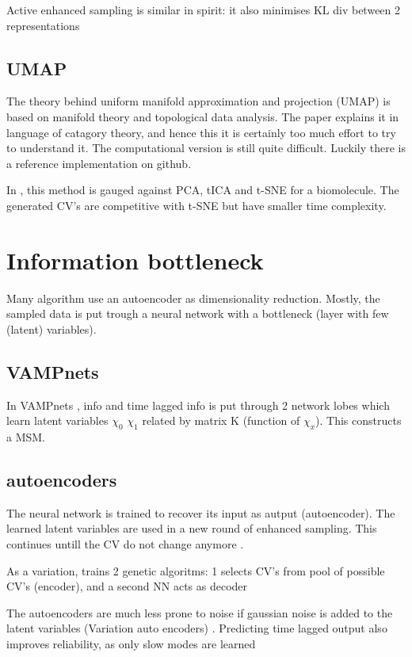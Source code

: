 \documentclass{article}
\begin{document}
Active enhanced sampling \cite{Zhang2018} is similar in spirit: it also minimises KL div between 2 representations

\subsection{UMAP}\label{ss:umap}

The theory behind uniform manifold approximation and projection (UMAP) \cite{McInnes2018} is based on manifold theory and topological data analysis. The paper explains it in language of catagory theory, and hence this it is certainly too much effort to try to understand it. The computational version is still quite difficult. Luckily there is a reference implementation on github.

In \cite{Trozzi2021}, this method is gauged against PCA, tICA and t-SNE for a biomolecule. The generated CV's are competitive with t-SNE but have smaller time complexity.

\section{Information bottleneck }

Many algorithm use an autoencoder as dimensionality reduction. Mostly, the sampled data is put trough a neural network with a bottleneck (layer with few (latent) variables).

\subsection{VAMPnets  }
In VAMPnets \cite{Mardt2017}, info and time lagged info is put through 2 network lobes which learn latent variables $\chi_0$ $\chi_1$ related by matrix K (function of $\chi_x$). This constructs a MSM.

\subsection{autoencoders}

The neural network is trained to recover its input as autput (autoencoder). The learned latent variables are used in a new round of enhanced sampling. This continues untill the CV do not change anymore \cite{Chen2018}.

As a variation, \cite{Hooft2021} trains 2 genetic algoritms: 1 selects CV's from pool of possible CV's (encoder), and a second NN acts as decoder

The autoencoders are much less prone to noise if gaussian noise is added to the latent variables (Variation auto encoders) \cite{Shoberl2019,Hernandez2017,Bozkurt2020}.
Predicting time lagged output also improves reliability, as only slow modes are learned \cite{Wehmeyer2018,Hernandez2017}
\end{document}
